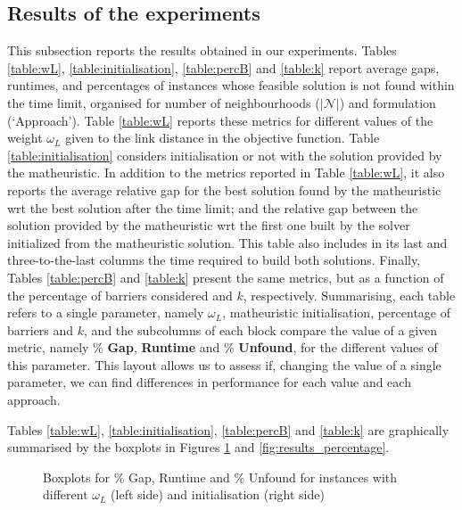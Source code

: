 \documentclass[a4paper,  review, authoryear, 1p.]{elsarticle}
\begin{document}
		\subsection{Results of the experiments}
		This subsection reports the results obtained in our experiments.
		Tables \ref{table:wL}, \ref{table:initialisation}, \ref{table:percB}  and \ref{table:k} report average gaps, runtimes, and percentages of instances whose feasible solution is not found within the time limit, organised for number of neighbourhoods ($| \mathcal{N}|$)  and formulation (`Approach'). Table \ref{table:wL} reports these metrics for different values of the weight $\omega_L$ given to the link distance in the objective function.  Table  \ref{table:initialisation}  considers initialisation or not with the solution provided by the matheuristic. In addition to the metrics reported in Table \ref{table:wL}, it also reports the average relative gap for the best solution found by the matheuristic wrt the best solution after the time limit; and the relative gap between the solution provided by the matheuristic wrt the first one built by the solver initialized from the matheuristic solution. This table also includes in its last and three-to-the-last columns the time required  to build both solutions. Finally, Tables \ref{table:percB} and \ref{table:k}  present the same metrics, but as a function of the percentage of barriers considered and $k$, respectively. Summarising, each table refers to a single parameter, namely $\omega_L$, matheuristic initialisation, percentage of barriers and $k$, and the subcolumns of each block  compare the value of a given metric, namely $\%$ \textbf{Gap}, \textbf{Runtime} and $\%$ \textbf{Unfound}, for the different values of  this parameter. This layout allows us to assess if, changing the value of a single parameter, we can find differences in performance for each value and each approach.

		
		
		
		
		
		Tables  \ref{table:wL}, \ref{table:initialisation}, \ref{table:percB} and \ref{table:k} are graphically summarised by the boxplots in Figures \ref{fig:results_wL} and \ref{fig:results_percentage}.

		\begin{figure}[h!]
			\centering
			\caption{Boxplots for \% Gap, Runtime and \% Unfound for instances with different $\omega_L$ (left side) and initialisation (right side)}
			
			\label{fig:results_wL}
			
		\end{figure}
\end{document}
